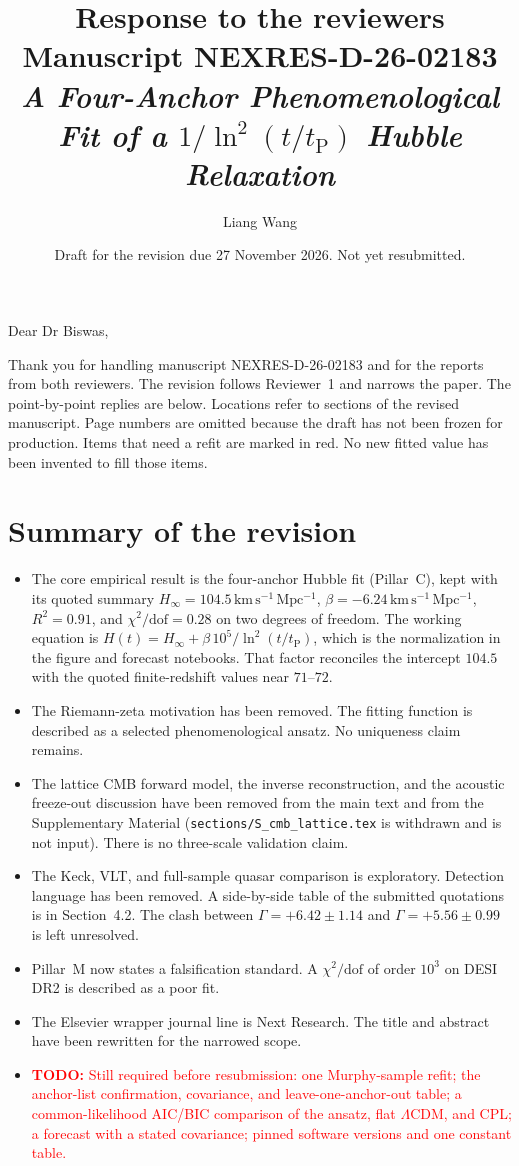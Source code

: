 \documentclass[11pt,a4paper]{article}
\title{Response to the reviewers\\
\large Manuscript NEXRES-D-26-02183\\
\textit{A Four-Anchor Phenomenological Fit of a $1/\ln^2(t/t_{\mathrm{P}})$ Hubble Relaxation}}
\author{Liang Wang}
\date{Draft for the revision due 27 November 2026. Not yet resubmitted.}
\newcommand{\revtodo}[1]{\textcolor{red}{\textbf{TODO:} #1}}
\begin{document}
\maketitle

Dear Dr Biswas,

Thank you for handling manuscript NEXRES-D-26-02183 and for the reports from both reviewers.
The revision follows Reviewer~1 and narrows the paper.
The point-by-point replies are below.
Locations refer to sections of the revised manuscript.
Page numbers are omitted because the draft has not been frozen for production.
Items that need a refit are marked in red.
No new fitted value has been invented to fill those items.

\section*{Summary of the revision}

\begin{itemize}[leftmargin=1.4em]
  \item The core empirical result is the four-anchor Hubble fit (Pillar~C), kept with its quoted summary $H_\infty = 104.5\,\mathrm{km\,s^{-1}\,Mpc^{-1}}$, $\beta = -6.24\,\mathrm{km\,s^{-1}\,Mpc^{-1}}$, $R^2 = 0.91$, and $\chi^2/\mathrm{dof} = 0.28$ on two degrees of freedom.
  The working equation is $H(t) = H_\infty + \beta\,10^{5}/\ln^2(t/t_{\mathrm{P}})$, which is the normalization in the figure and forecast notebooks.
  That factor reconciles the intercept $104.5$ with the quoted finite-redshift values near $71$--$72$.
  \item The Riemann-zeta motivation has been removed.
  The fitting function is described as a selected phenomenological ansatz.
  No uniqueness claim remains.
  \item The lattice CMB forward model, the inverse reconstruction, and the acoustic freeze-out discussion have been removed from the main text and from the Supplementary Material (\texttt{sections/S\_cmb\_lattice.tex} is withdrawn and is not input).
  There is no three-scale validation claim.
  \item The Keck, VLT, and full-sample quasar comparison is exploratory.
  Detection language has been removed.
  A side-by-side table of the submitted quotations is in Section~4.2.
  The clash between $\Gamma = +6.42\pm 1.14$ and $\Gamma = +5.56\pm 0.99$ is left unresolved.
  \item Pillar~M now states a falsification standard.
  A $\chi^2/\mathrm{dof}$ of order $10^{3}$ on DESI DR2 is described as a poor fit.
  \item The Elsevier wrapper journal line is Next Research.
  The title and abstract have been rewritten for the narrowed scope.
  \item \revtodo{Still required before resubmission: one Murphy-sample refit; the anchor-list confirmation, covariance, and leave-one-anchor-out table; a common-likelihood AIC/BIC comparison of the ansatz, flat $\Lambda$CDM, and CPL; a forecast with a stated covariance; pinned software versions and one constant table.}
\end{itemize}
\end{document}
